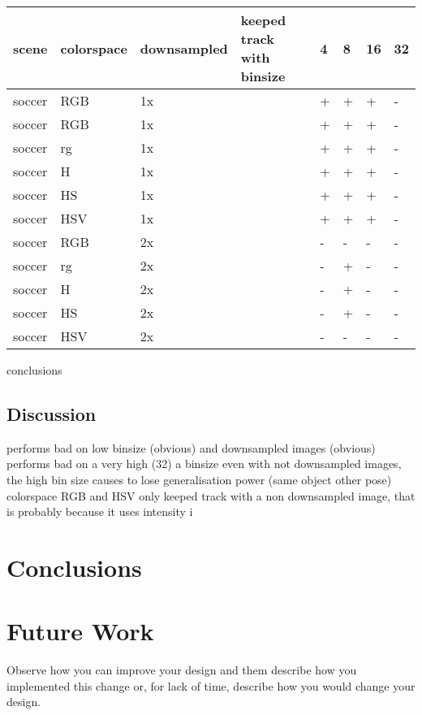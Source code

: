 \documentclass[a4paper,11pt]{article}
\begin{document}
	\begin{tabular}{l | l | l | l}
		scene	& 	colorspace	& downsampled & keeped track with binsize & 4 & 8 & 16 & 32\\
		\hline
		soccer 	& 	RGB	 		& 1x		  &							  & + & + & +  &  -\\
		soccer 	& 	RGB	 		& 1x		  &							  & + & + & +  &  -\\
		soccer 	& 	rg	 		& 1x 		  &							  & + & + & +  &  -\\
		soccer 	& 	H	 		& 1x		  &							  & + & + & +  &  -\\
		soccer 	& 	HS	 		& 1x		  &							  & + & + & +  &  -\\
		soccer 	& 	HSV	 		& 1x		  &							  & + & + & +  &  -\\
		soccer 	& 	RGB	 		& 2x		  &							  & - & - & -  &  -\\
		soccer 	& 	rg	 		& 2x 		  &							  & - & + & -  &  -\\
		soccer 	& 	H	 		& 2x		  &							  & - & + & -  &  -\\
		soccer 	& 	HS	 		& 2x		  &							  & - & + & -  &  -\\
		soccer 	& 	HSV	 		& 2x		  &							  & - & - & -  &  -\\
	\end{tabular}	

	conclusions

\subsection{Discussion} %
		performs bad on low binsize (obvious) and downsampled images (obvious)\\

		performs bad on a very high (32) a binsize even with not downsampled
		images, the high bin size causes to lose generalisation power (same object other pose)\\
		
		colorspace RGB and HSV only keeped track with a non downsampled image,
		that is probably because it uses intensity i


\section{Conclusions} \label{sec:conc}
\section{Future Work} \label{sec:fut}
Observe how you can improve your design and them describe how you implemented this change or, for lack of time, describe how you would change your design. 
\end{document}
